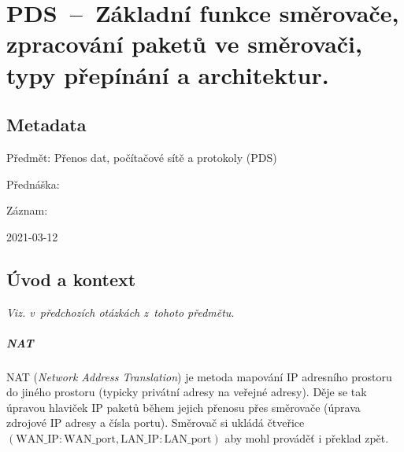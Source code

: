 

\graphicspath{{pds/smerovace/figures}}


\chapter{PDS~--~Základní funkce směrovače, zpracování paketů ve směrovači, typy přepínání a architektur.}


\section{Metadata}

\begin{compactitem}
    \item Předmět: Přenos dat, počítačové sítě a protokoly (PDS)
    \item Přednáška:
    \begin{compactitem}
        \item {}
    \end{compactitem}
    \item Záznam:
    \begin{compactitem}
        \item 2021-03-12
    \end{compactitem}
\end{compactitem}


\section{Úvod a kontext}


\textit{Viz.  v~předchozích otázkách z~tohoto předmětu.}

\paragraph*{NAT} NAT (\textit{Network Address Translation}) je metoda mapování IP adresního prostoru do jiného prostoru (typicky privátní adresy na veřejné adresy). Děje se tak úpravou hlaviček IP paketů během jejich přenosu přes směrovače (úprava zdrojové IP adresy a čísla portu). Směrovač si ukládá čtveřice $(\text{WAN\_IP}:\text{WAN\_port}, \text{LAN\_IP}:\text{LAN\_port})$ aby mohl prováděť i překlad zpět.

